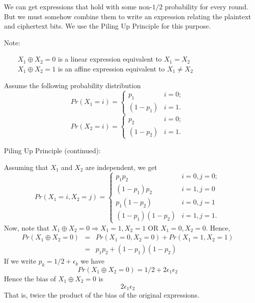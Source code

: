 \documentclass[9pt]{beamer}
\begin{document}
\begin{frame}
We can get expressions that hold with some non-$1/2$ probability for every round. But we must somehow combine them to write an expression relating the plaintext and ciphertext bits. \pause We use the Piling Up Principle for this purpose.

\vspace{5mm}
\pause Note:

$\qquad X_1 \oplus X_2 = 0$ is a linear expression equivalent to $X_1 = X_2$\\
$\qquad X_1 \oplus X_2 = 1$ is an affine expression equivalent to $X_1 \neq X_2$

\vspace{5mm}
\pause Assume the following probability distribution
\[ Pr(X_1 = i)  = \left\{ \begin{array}{ll}
         p_1 & \mbox{$i = 0$};\\
         (1 - p_1) & \mbox{$i = 1$}.\end{array} \right. \] 
\[ Pr(X_2 = i)  = \left\{ \begin{array}{ll}
         p_2 & \mbox{$i = 0$};\\
         (1 - p_2) & \mbox{$i = 1$}.\end{array} \right. \] 
\end{frame}

\begin{frame}
Piling Up Principle (continued):

\vspace{5mm}
Assuming that $X_1$ and $X_2$ are independent, we get
\[ Pr(X_1 = i, X_2 = j)  = \left\{ \begin{array}{ll}
         p_1 p_2 & \mbox{$i = 0, j = 0$};\\
         (1 - p_1) p_2 & \mbox{$i = 1, j = 0$} \\
			p_1 (1 - p_2) & \mbox{$i = 0, j = 1$} \\
			(1 - p_1)(1 - p_2) & \mbox{$i = 1, j = 1$}.\end{array} \right. \] 
\pause Now, note that $X_1 \oplus X_2 = 0 \Rightarrow X_1 = 1, X_2 =1$ OR $X_1 = 0, X_2 = 0$. \pause Hence,
\begin{eqnarray*}
 Pr(X_1 \oplus X_2 = 0) & = & Pr(X_1=0,X_2=0) + Pr(X_1=1,X_2=1) \\
								& = & p_1p_2 + (1 - p_1)(1-p_2)
\end{eqnarray*}
\pause If we write $p_k = 1/2 + \epsilon_k$ we have
\[ Pr(X_1 \oplus X_2 = 0) = 1/2 + 2\epsilon_1 \epsilon_2 \]
\pause Hence the bias of $X_1 \oplus X_2 = 0$ is 
\[ 2 \epsilon_1 \epsilon_2 \]
That is, twice the product of the bias of the original expressions.
\end{frame}
\end{document}
